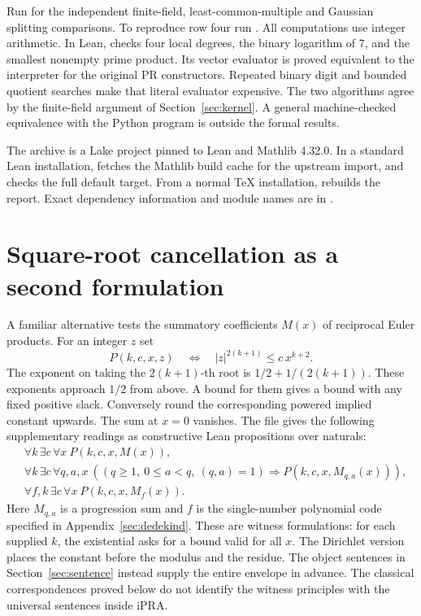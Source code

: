 \documentclass[11pt]{article}
\begin{document}
Run  for the independent finite-field, least-common-multiple and Gaussian splitting comparisons. To reproduce row four run . All computations use integer arithmetic. In Lean,  checks four local degrees, the binary logarithm of \(7\), and the smallest nonempty prime product. Its vector evaluator is proved equivalent to the interpreter for the original PR constructors. Repeated binary digit and bounded quotient searches make that literal evaluator expensive. The two algorithms agree by the finite-field argument of Section~\ref{sec:kernel}. A general machine-checked equivalence with the Python program is outside the formal results.

The archive is a Lake project pinned to Lean and Mathlib 4.32.0. In a standard Lean installation,  fetches the Mathlib build cache for the upstream import, and  checks the full default target. From a normal TeX installation,  rebuilds the report. Exact dependency information and module names are in .
\appendix\newpage
\section{Square-root cancellation as a second formulation}\label{sec:mertens-start}
A familiar alternative tests the summatory coefficients \(M(x)\) of reciprocal Euler products. For an integer \(z\) set
\[
    P(k,c,x,z)\quad\Longleftrightarrow\quad
     |z|^{2(k+1)}\le c\,x^{k+2}.
\]
The exponent on taking the \(2(k+1)\)-th root is \(1/2+1/(2(k+1))\). These exponents approach \(1/2\) from above. A bound for them gives a bound with any fixed positive slack. Conversely round the corresponding powered implied constant upwards. The sum at \(x=0\) vanishes. The file  gives the following supplementary readings as constructive Lean propositions over naturals:
\begin{align*}
 &\forall k\,\exists c\,\forall x\ P(k,c,x,M(x)),\\
 &\forall k\,\exists c\,\forall q,a,x\
    ((q\ge1,\ 0\le a<q,\ (q,a)=1)\Rightarrow P(k,c,x,M_{q,a}(x))),\\
 &\forall f,k\,\exists c\,\forall x\ P(k,c,x,M_f(x)).
\end{align*}
Here \(M_{q,a}\) is a progression sum and \(f\) is the single-number polynomial code specified in Appendix~\ref{sec:dedekind}. These are witness formulations: for each supplied \(k\), the existential asks for a bound valid for all \(x\). The Dirichlet version places the constant before the modulus and the residue. The object sentences in Section~\ref{sec:sentence} instead supply the entire envelope in advance. The classical correspondences proved below do not identify the witness principles with the universal sentences inside iPRA.
\end{document}
